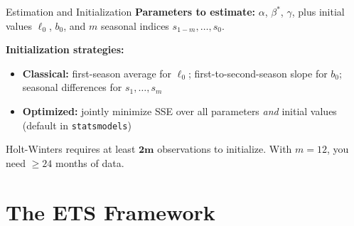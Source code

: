 \documentclass[aspectratio=169, 11pt]{beamer}
\begin{document}
\begin{frame}{Estimation and Initialization}
  \textbf{Parameters to estimate:} $\alpha$, $\beta^*$, $\gamma$, plus initial
  values $\ell_0$, $b_0$, and $m$ seasonal indices $s_{1-m}, \ldots, s_0$.

  \textbf{Initialization strategies:}
  \begin{itemize}\small
    \item \textbf{Classical:} first-season average for $\ell_0$;
          first-to-second-season slope for $b_0$;
          seasonal differences for $s_1, \ldots, s_m$
    \item \textbf{Optimized:} jointly minimize SSE over all parameters
          \emph{and} initial values (default in \texttt{statsmodels})
  \end{itemize}
  \begin{warningbox}
    Holt-Winters requires at least $\mathbf{2m}$ observations to initialize.
    With $m = 12$, you need $\geq 24$ months of data.
  \end{warningbox}
\end{frame}

\section{The ETS Framework}

\end{document}
